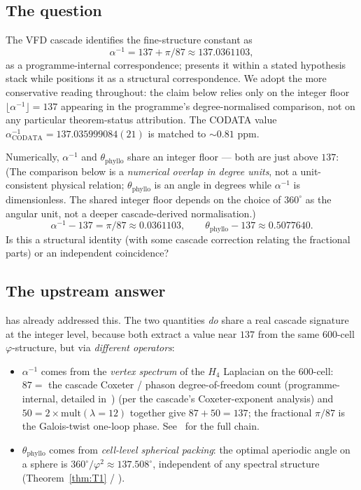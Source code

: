 \documentclass[12pt]{article}
\newcommand{\phig}{\varphi}
\begin{document}
\subsection{The question}

The VFD cascade identifies the fine-structure constant as
\begin{equation}\label{eq:alphaInv}
    \alpha^{-1} = 137 + \pi/87 \approx 137.0361103,
\end{equation}
as a programme-internal correspondence; \cite{CascadeAlphaChain}
presents it within a stated hypothesis stack while
\cite{SmartXXII} positions it as a structural correspondence. We
adopt the more conservative reading throughout: the claim below
relies only on the integer floor $\lfloor \alpha^{-1} \rfloor =
137$ appearing in the programme's degree-normalised comparison,
not on any particular theorem-status attribution. The CODATA value
$\alpha^{-1}_{\mathrm{CODATA}} = 137.035999084(21)$
is matched to $\sim 0.81$ ppm.

Numerically, $\alpha^{-1}$ and $\theta_{\mathrm{phyllo}}$ share an
integer floor --- both are just above $137$:
(The comparison below is a \emph{numerical overlap in degree
units}, not a unit-consistent physical relation;
$\theta_{\mathrm{phyllo}}$ is an angle in degrees while
$\alpha^{-1}$ is dimensionless. The shared integer floor depends
on the choice of $360^{\circ}$ as the angular unit, not a
deeper cascade-derived normalisation.)
\[
    \alpha^{-1} - 137 = \pi/87 \approx 0.0361103, \qquad
    \theta_{\mathrm{phyllo}} - 137 \approx 0.5077640.
\]
Is this a structural identity (with some cascade correction
relating the fractional parts) or an independent coincidence?

\subsection{The upstream answer}

\cite[\S B6.1--B6.2]{CascadeBio} has already addressed this. The
two quantities \emph{do} share a real cascade signature at the
integer level, because both extract a value near $137$ from the
same $600$-cell $\phig$-structure, but via \emph{different
operators}:
\begin{itemize}
\item $\alpha^{-1}$ comes from the \emph{vertex spectrum} of the
  $H_4$ Laplacian on the $600$-cell: $87 = $ the cascade
  Coxeter / phason degree-of-freedom count (programme-internal,
  detailed in~\cite{CascadeAlphaChain})
  (per the cascade's Coxeter-exponent analysis) and $50 = 2\times
  \mathrm{mult}(\lambda = 12)$ together give $87 + 50 = 137$; the
  fractional $\pi/87$ is the Galois-twist one-loop phase.
  See~\cite[\S 1]{CascadeAlphaChain} for the full chain.
\item $\theta_{\mathrm{phyllo}}$ comes from \emph{cell-level
  spherical packing}: the optimal aperiodic angle on a sphere is
  $360^{\circ}/\phig^2 \approx 137.508^{\circ}$, independent of
  any spectral structure (Theorem~\ref{thm:T1} /
  \cite{Coxeter1953,Vogel1979}).
\end{itemize}
\end{document}

